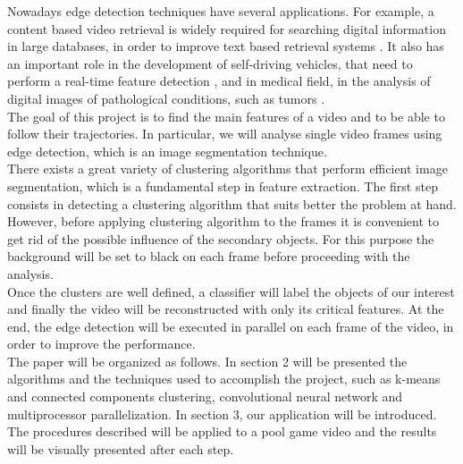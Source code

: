 \documentclass{article}
\begin{document}
{Nowadays edge detection techniques have several applications. For example, a content based video retrieval is widely required for searching digital information in large databases, in order to improve text based retrieval systems \cite{1}. It also has an important role in the development of self-driving vehicles, that need to perform a real-time feature detection \cite{2}, and in medical field, in the analysis of digital images of pathological conditions, such as tumors \cite{3}. \\
The goal of this project is to find the main features of a video and to be able to follow their trajectories. In particular, we will analyse single video frames using edge detection, which is an image segmentation technique. \\
There exists a great variety of clustering algorithms that perform efficient image segmentation, which is a fundamental step in feature extraction. The first step consists in detecting a clustering algorithm that suits better the problem at hand. 
However, before applying clustering algorithm to the frames it is convenient to get rid of the possible influence of the secondary objects. For this purpose the background will be set to black on each frame before proceeding with the analysis. \\
Once the clusters are well defined, a classifier will label the objects of our interest and finally the video will be reconstructed with only its critical features. At the end, the edge detection will be executed in parallel on each frame of the video, in order to improve the performance. \\
The paper will be organized as follows. In section 2 will be presented the algorithms and the techniques used to accomplish the project, such as k-means and connected components clustering, convolutional neural network and multiprocessor parallelization. In section 3, our application will be introduced. The procedures described will be applied to a pool game video and the results will be visually presented  after each step. 
}
\end{document}
